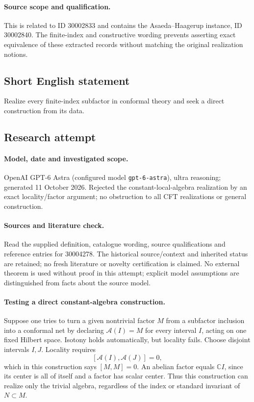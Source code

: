 \documentclass[11pt]{article}
\begin{document}
\paragraph{Source scope and qualification.}
This is related to ID 30002833 and contains the Asaeda--Haagerup instance, ID 30002840. The finite-index and constructive wording prevents asserting exact equivalence of these extracted records without matching the original realization notions.
\subsection{Short English statement}
Realize every finite-index subfactor in conformal theory and seek a direct construction from its data.
\subsection{Research attempt}
\paragraph{Model, date and investigated scope.}
OpenAI GPT-6 Astra (configured model \texttt{gpt-6-astra}), ultra reasoning; generated 11 October 2026. Rejected the constant-local-algebra realization by an exact locality/factor argument; no obstruction to all CFT realizations or general construction.

\paragraph{Sources and literature check.}
Read the supplied definition, catalogue wording, source qualifications and reference entries for 30004278. The historical source/context and inherited status are retained; no fresh literature or novelty certification is claimed. No external theorem is used without proof in this attempt; explicit model assumptions are distinguished from facts about the source model.

\paragraph{Testing a direct constant-algebra construction.} Suppose one tries to turn a given nontrivial factor \(M\) from a subfactor inclusion into a conformal net by declaring \(\mathcal A(I)=M\) for every interval \(I\), acting on one fixed Hilbert space. Isotony holds automatically, but locality fails. Choose disjoint intervals \(I,J\). Locality requires
\[
 [\mathcal A(I),\mathcal A(J)]=0,
\]
which in this construction says \([M,M]=0\). An abelian factor equals \(\mathbb C I\), since its center is all of itself and a factor has scalar center. Thus this construction can realize only the trivial algebra, regardless of the index or standard invariant of \(N\subset M\).
\end{document}
